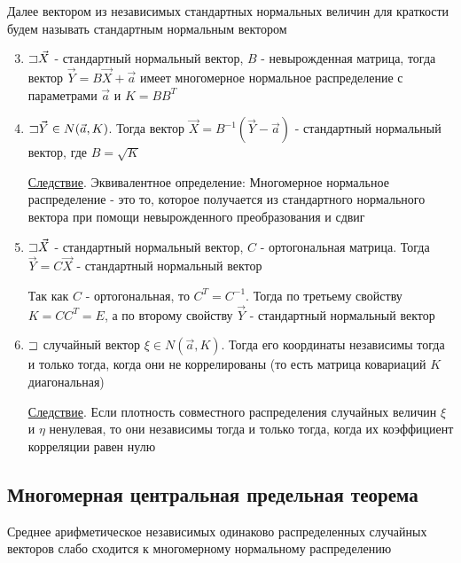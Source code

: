 \documentclass[12pt]{article}
\begin{document}
Далее вектором из независимых стандартных нормальных величин для краткости будем называть стандартным нормальным вектором

\begin{enumerate}
    \setcounter{enumi}{2}

    \item $\mathord{\sqsupset} \vec X$ - стандартный нормальный вектор, $B$ - невырожденная матрица, 
    тогда вектор $\vec Y = B \vec X + \vec a$ имеет многомерное нормальное распределение с параметрами $\vec a$ и $K = B B^T$

    \item $\mathord{\sqsupset} \vec Y \in N(\vec a, K)$. Тогда вектор $\vec X = B^{-1} (\vec Y - \vec a)$ - стандартный нормальный вектор, где $B = \sqrt{K}$

    \underline{Следствие}. Эквивалентное определение: Многомерное нормальное распределение - это то, которое получается из
    стандартного нормального вектора при помощи невырожденного преобразования и сдвиг

    \item $\mathord{\sqsupset} \vec X$ - стандартный нормальный вектор, $C$ - ортогональная матрица. Тогда $\vec Y = C \vec X$ - стандартный нормальный вектор

    \begin{MyProof}
        Так как $C$ - ортогональная, то $C^T = C^{-1}$. Тогда по третьему свойству $K = C C^T = E$, а по второму свойству $\vec Y$ - стандартный нормальный вектор
    \end{MyProof}

    \item $\mathord{\sqsupset}$ случайный вектор $\xi \in N(\vec a, K)$.
    Тогда его координаты независимы тогда и только тогда, когда они не коррелированы (то есть матрица ковариаций $K$ диагональная)

    \underline{Следствие}. Если плотность совместного распределения случайных величин $\xi$ и $\eta$ ненулевая, то они независимы тогда и только тогда, 
    когда их коэффициент корреляции равен нулю
\end{enumerate}

\subsection{Многомерная центральная предельная теорема}

\begin{MyTheorem} 
    \Ths Среднее арифметическое независимых одинаково распределенных случайных векторов слабо сходится к многомерному нормальному распределению
\end{MyTheorem}
\end{document}
